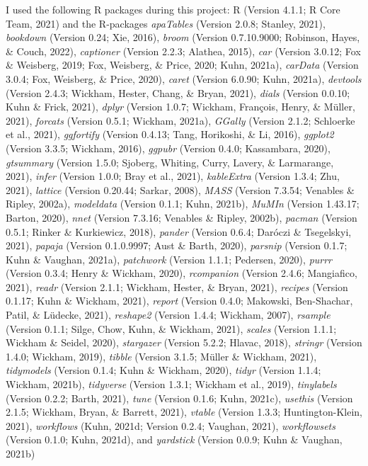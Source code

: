 \documentclass[
  english,
  doc,floatsintext]{apa6}
\begin{document}
I used the following R packages during this project:
R (Version 4.1.1; R Core Team, 2021) and the R-packages \emph{apaTables} (Version 2.0.8; Stanley, 2021), \emph{bookdown} (Version 0.24; Xie, 2016), \emph{broom} (Version 0.7.10.9000; Robinson, Hayes, \& Couch, 2022), \emph{captioner} (Version 2.2.3; Alathea, 2015), \emph{car} (Version 3.0.12; Fox \& Weisberg, 2019; Fox, Weisberg, \& Price, 2020; Kuhn, 2021a), \emph{carData} (Version 3.0.4; Fox, Weisberg, \& Price, 2020), \emph{caret} (Version 6.0.90; Kuhn, 2021a), \emph{devtools} (Version 2.4.3; Wickham, Hester, Chang, \& Bryan, 2021), \emph{dials} (Version 0.0.10; Kuhn \& Frick, 2021), \emph{dplyr} (Version 1.0.7; Wickham, François, Henry, \& Müller, 2021), \emph{forcats} (Version 0.5.1; Wickham, 2021a), \emph{GGally} (Version 2.1.2; Schloerke et al., 2021), \emph{ggfortify} (Version 0.4.13; Tang, Horikoshi, \& Li, 2016), \emph{ggplot2} (Version 3.3.5; Wickham, 2016), \emph{ggpubr} (Version 0.4.0; Kassambara, 2020), \emph{gtsummary} (Version 1.5.0; Sjoberg, Whiting, Curry, Lavery, \& Larmarange, 2021), \emph{infer} (Version 1.0.0; Bray et al., 2021), \emph{kableExtra} (Version 1.3.4; Zhu, 2021), \emph{lattice} (Version 0.20.44; Sarkar, 2008), \emph{MASS} (Version 7.3.54; Venables \& Ripley, 2002a), \emph{modeldata} (Version 0.1.1; Kuhn, 2021b), \emph{MuMIn} (Version 1.43.17; Barton, 2020), \emph{nnet} (Version 7.3.16; Venables \& Ripley, 2002b), \emph{pacman} (Version 0.5.1; Rinker \& Kurkiewicz, 2018), \emph{pander} (Version 0.6.4; Daróczi \& Tsegelskyi, 2021), \emph{papaja} (Version 0.1.0.9997; Aust \& Barth, 2020), \emph{parsnip} (Version 0.1.7; Kuhn \& Vaughan, 2021a), \emph{patchwork} (Version 1.1.1; Pedersen, 2020), \emph{purrr} (Version 0.3.4; Henry \& Wickham, 2020), \emph{rcompanion} (Version 2.4.6; Mangiafico, 2021), \emph{readr} (Version 2.1.1; Wickham, Hester, \& Bryan, 2021), \emph{recipes} (Version 0.1.17; Kuhn \& Wickham, 2021), \emph{report} (Version 0.4.0; Makowski, Ben-Shachar, Patil, \& Lüdecke, 2021), \emph{reshape2} (Version 1.4.4; Wickham, 2007), \emph{rsample} (Version 0.1.1; Silge, Chow, Kuhn, \& Wickham, 2021), \emph{scales} (Version 1.1.1; Wickham \& Seidel, 2020), \emph{stargazer} (Version 5.2.2; Hlavac, 2018), \emph{stringr} (Version 1.4.0; Wickham, 2019), \emph{tibble} (Version 3.1.5; Müller \& Wickham, 2021), \emph{tidymodels} (Version 0.1.4; Kuhn \& Wickham, 2020), \emph{tidyr} (Version 1.1.4; Wickham, 2021b), \emph{tidyverse} (Version 1.3.1; Wickham et al., 2019), \emph{tinylabels} (Version 0.2.2; Barth, 2021), \emph{tune} (Version 0.1.6; Kuhn, 2021c), \emph{usethis} (Version 2.1.5; Wickham, Bryan, \& Barrett, 2021), \emph{vtable} (Version 1.3.3; Huntington-Klein, 2021), \emph{workflows} (Kuhn, 2021d; Version 0.2.4; Vaughan, 2021), \emph{workflowsets} (Version 0.1.0; Kuhn, 2021d), and \emph{yardstick} (Version 0.0.9; Kuhn \& Vaughan, 2021b)
\end{document}
